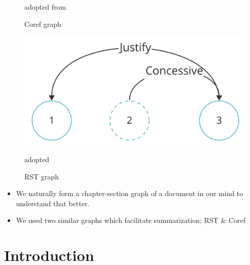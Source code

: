 \documentclass{beamer}
\begin{document}
\begin{frame}
\begin{minipage}[t][0.6\textheight][t]{\textwidth}
\begin{minipage}{0.3\textwidth}
\begin{figure}[ht]
            \caption*{Coref graph}
            {\tiny adopted from \citep{DiscoBERT}}
        \end{figure}
    \end{minipage}%
    \hfill
    \begin{minipage}{0.3\textwidth}
      \centering
        \begin{figure}[ht]
            \centering
            \includegraphics[width=\textwidth]{imgs/rst_graph.png}
            \caption*{RST graph}
            {\tiny adopted \citep{rst1988}}
        \end{figure}
    \end{minipage}
  \end{minipage}
 

  \begin{minipage}[t][0.4\textheight][t]{\textwidth}
    \begin{itemize}
      \item We naturally form a chapter-section graph of a document in our mind to understand that better.      %
      \item We used two similar graphs which facilitate summarization; RST {\tiny \citep{rst1988}} \& Coref {\tiny \citep{coreference-review}}
    \end{itemize}
  \end{minipage}

\end{frame}






\section{Introduction}
\end{document}
